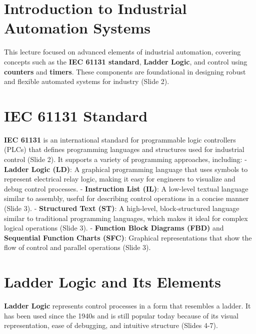 \documentclass[
  14pt,
  a4paper,
  numbers=noendperiod,
  headinclude=true,
  footinclude=true,
  DIV=calc]{scrreprt}
\begin{document}
\section{Introduction to Industrial Automation
Systems}\label{introduction-to-industrial-automation-systems}

This lecture focused on advanced elements of industrial automation,
covering concepts such as the \textbf{IEC 61131 standard},
\textbf{Ladder Logic}, and control using \textbf{counters} and
\textbf{timers}. These components are foundational in designing robust
and flexible automated systems for industry (Slide 2).

\section{IEC 61131 Standard}\label{iec-61131-standard}

\textbf{IEC 61131} is an international standard for programmable logic
controllers (PLCs) that defines programming languages and structures
used for industrial control (Slide 2). It supports a variety of
programming approaches, including: - \textbf{Ladder Logic (LD)}: A
graphical programming language that uses symbols to represent electrical
relay logic, making it easy for engineers to visualize and debug control
processes. - \textbf{Instruction List (IL)}: A low-level textual
language similar to assembly, useful for describing control operations
in a concise manner (Slide 3). - \textbf{Structured Text (ST)}: A
high-level, block-structured language similar to traditional programming
languages, which makes it ideal for complex logical operations (Slide
3). - \textbf{Function Block Diagrams (FBD)} and \textbf{Sequential
Function Charts (SFC)}: Graphical representations that show the flow of
control and parallel operations (Slide 3).

\section{Ladder Logic and Its
Elements}\label{ladder-logic-and-its-elements}

\textbf{Ladder Logic} represents control processes in a form that
resembles a ladder. It has been used since the 1940s and is still
popular today because of its visual representation, ease of debugging,
and intuitive structure (Slides 4-7).
\end{document}
